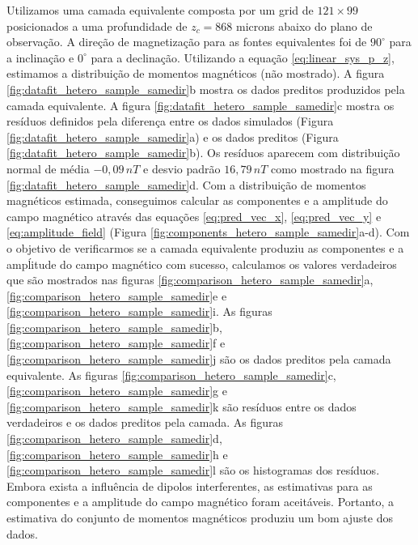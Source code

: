 Utilizamos uma camada equivalente composta por um grid de $121 \times 99$ posicionados a uma profundidade de $z_c = 868$ microns abaixo do plano de observação. A direção de magnetização para as fontes equivalentes foi de $90^\circ$ para a inclinação e $0^\circ$ para a declinação. Utilizando a equação \ref{eq:linear_sys_p_z}, estimamos a distribuição de momentos magnéticos (não mostrado). A figura \ref{fig:datafit_hetero_sample_samedir}b mostra os dados preditos produzidos pela camada equivalente. A figura \ref{fig:datafit_hetero_sample_samedir}c mostra os resíduos definidos pela diferença entre os dados simulados (Figura \ref{fig:datafit_hetero_sample_samedir}a) e os dados preditos (Figura \ref{fig:datafit_hetero_sample_samedir}b). Os resíduos aparecem com distribuição normal de média $-0,09 \, nT$ e desvio padrão $16,79 \, nT$ como mostrado na figura \ref{fig:datafit_hetero_sample_samedir}d. Com a distribuição de momentos magnéticos estimada, conseguimos calcular as componentes e a amplitude do campo magnético através das equações \ref{eq:pred_vec_x}, \ref{eq:pred_vec_y} e \ref{eq:amplitude_field} (Figura \ref{fig:components_hetero_sample_samedir}a-d). Com o objetivo de verificarmos se a camada equivalente produziu as componentes e a ampĺitude do campo magnético com sucesso, calculamos os valores verdadeiros que são mostrados nas  figuras \ref{fig:comparison_hetero_sample_samedir}a, \ref{fig:comparison_hetero_sample_samedir}e e \ref{fig:comparison_hetero_sample_samedir}i. As figuras \ref{fig:comparison_hetero_sample_samedir}b, \ref{fig:comparison_hetero_sample_samedir}f e \ref{fig:comparison_hetero_sample_samedir}j são os dados preditos pela camada equivalente. As figuras \ref{fig:comparison_hetero_sample_samedir}c, \ref{fig:comparison_hetero_sample_samedir}g e \ref{fig:comparison_hetero_sample_samedir}k são resíduos entre os dados verdadeiros e os dados preditos pela camada. As figuras \ref{fig:comparison_hetero_sample_samedir}d, \ref{fig:comparison_hetero_sample_samedir}h e \ref{fig:comparison_hetero_sample_samedir}l são os histogramas dos resíduos. Embora exista a influência de dipolos interferentes, as estimativas para as componentes e a amplitude do campo magnético foram aceitáveis. Portanto, a estimativa do conjunto de momentos magnéticos produziu um bom ajuste dos dados.   


